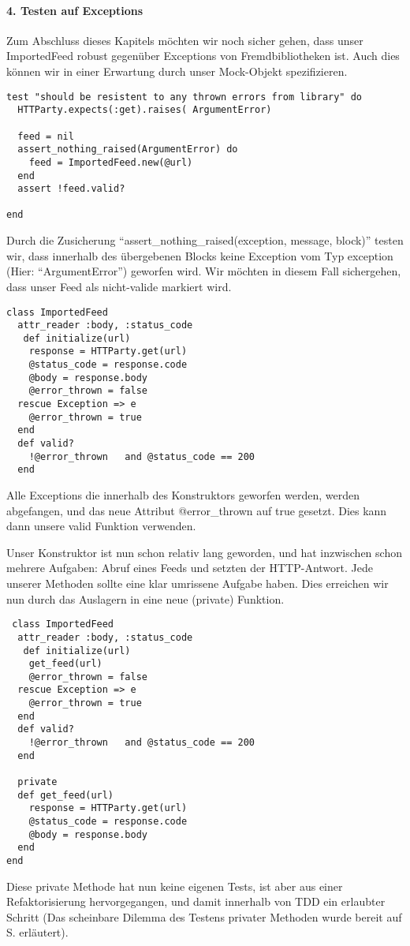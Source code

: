 \paragraph{4. Testen auf Exceptions}

Zum Abschluss dieses Kapitels möchten wir noch sicher gehen, dass unser ImportedFeed robust gegenüber Exceptions von Fremdbibliotheken ist. Auch dies können wir in einer Erwartung durch unser Mock-Objekt spezifizieren.

\begin{lstlisting}
test "should be resistent to any thrown errors from library" do
  HTTParty.expects(:get).raises( ArgumentError)

  feed = nil
  assert_nothing_raised(ArgumentError) do
    feed = ImportedFeed.new(@url)
  end
  assert !feed.valid?

end
\end{lstlisting}
\tddred
Durch die Zusicherung "`assert\_nothing\_raised(exception, message, block)"' testen wir, dass innerhalb des übergebenen Blocks keine Exception vom Typ exception (Hier: "`ArgumentError"') geworfen wird. Wir möchten in diesem Fall sichergehen, dass unser Feed als nicht-valide markiert wird. 

\begin{lstlisting}
class ImportedFeed
  attr_reader :body, :status_code
   def initialize(url)
    response = HTTParty.get(url)
    @status_code = response.code
    @body = response.body    
    @error_thrown = false
  rescue Exception => e
    @error_thrown = true
  end
  def valid?
    !@error_thrown   and @status_code == 200
  end
\end{lstlisting}
\tddgreen
Alle Exceptions die innerhalb des Konstruktors geworfen werden, werden abgefangen, und das neue Attribut @error\_thrown auf true gesetzt. Dies kann dann unsere valid Funktion verwenden.

\tddrefactor

Unser Konstruktor ist nun schon relativ lang geworden, und hat inzwischen schon mehrere Aufgaben: Abruf eines Feeds und setzten der HTTP-Antwort. Jede unserer Methoden sollte eine klar umrissene Aufgabe haben. Dies erreichen wir nun durch das Auslagern in eine neue (private) Funktion.

\begin{lstlisting}
 class ImportedFeed
  attr_reader :body, :status_code
   def initialize(url)
    get_feed(url)
    @error_thrown = false
  rescue Exception => e
    @error_thrown = true
  end
  def valid?
    !@error_thrown   and @status_code == 200
  end

  private
  def get_feed(url)
    response = HTTParty.get(url)
    @status_code = response.code
    @body = response.body    
  end
end     
\end{lstlisting}
Diese private Methode hat nun keine eigenen Tests, ist aber aus einer Refaktorisierung hervorgegangen, und damit innerhalb von TDD ein erlaubter Schritt (Das scheinbare Dilemma des Testens privater Methoden wurde bereit auf S. \pageref{sec:tddspecialcircumstances} erläutert).


